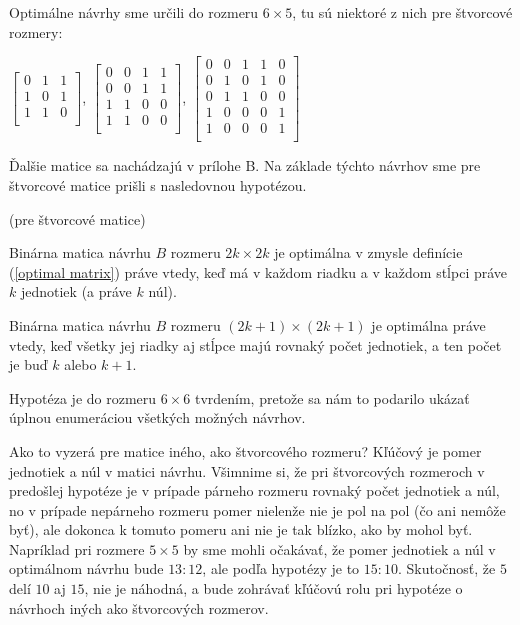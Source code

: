 Optimálne návrhy sme určili do rozmeru $6 \times 5$, tu sú niektoré z nich pre štvorcové rozmery:

\begin{center}
$
\begin{bmatrix}
0 & 1 & 1 \\ 
1 & 0 & 1 \\ 
1 & 1 & 0 \\ 
\end{bmatrix}
$, 
$
\begin{bmatrix}
0 & 0 & 1 & 1 \\
0 & 0 & 1 & 1 \\
1 & 1 & 0 & 0 \\
1 & 1 & 0 & 0 \\
\end{bmatrix}
$, 
$
\begin{bmatrix}
0 & 0 & 1 & 1 & 0 \\
0 & 1 & 0 & 1 & 0 \\
0 & 1 & 1 & 0 & 0 \\
1 & 0 & 0 & 0 & 1 \\
1 & 0 & 0 & 0 & 1 \\
\end{bmatrix}
$
\end{center}

Ďalšie matice sa nachádzajú v prílohe B. Na základe týchto návrhov sme pre štvorcové matice prišli s nasledovnou hypotézou.

\begin{hypoteza}
\label{hypoteza1}
(pre štvorcové matice)

Binárna matica návrhu $B$ rozmeru $2k \times 2k$ je optimálna v zmysle definície (\ref{optimal matrix}) práve vtedy, 
keď má v každom riadku a v každom stĺpci práve $k$ jednotiek (a práve $k$ núl).

Binárna matica návrhu $B$ rozmeru $(2k + 1) \times (2k + 1)$ je optimálna práve vtedy, 
keď všetky jej riadky aj stĺpce majú rovnaký počet jednotiek, a ten počet je buď $k$ alebo $k + 1$.
\end{hypoteza}

\begin{com}
Hypotéza je do rozmeru $6 \times 6$ tvrdením, pretože sa nám to podarilo ukázať úplnou enumeráciou všetkých možných návrhov.
\end{com}

Ako to vyzerá pre matice iného, ako štvorcového rozmeru? 
Kľúčový je pomer jednotiek a núl v matici návrhu. 
Všimnime si, že pri štvorcových rozmeroch v predošlej hypotéze je v prípade párneho rozmeru rovnaký počet jednotiek a núl, 
no v prípade nepárneho rozmeru pomer nielenže nie je pol na pol (čo ani nemôže byť), 
ale dokonca k tomuto pomeru ani nie je tak blízko, ako by mohol byť. 
Napríklad pri rozmere $5 \times 5$ by sme mohli očakávať, že pomer jednotiek a núl v optimálnom návrhu bude $13:12$, 
ale podľa hypotézy je to $15:10$. Skutočnosť, že $5$ delí $10$ aj $15$, nie je náhodná, 
a bude zohrávať kľúčovú rolu pri hypotéze o návrhoch iných ako štvorcových rozmerov.

